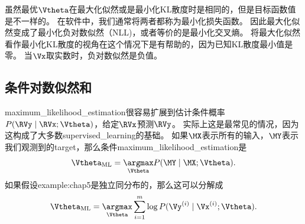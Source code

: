 虽然最优$\Vtheta$在最大化似然或是最小化KL散度时是相同的，但是目标函数值是不一样的。
在软件中，我们通常将两者都称为最小化损失函数。
因此最大化似然变成了最小化负对数似然（NLL)，或者等价的是最小化交叉熵。
将最大化似然看作最小化KL散度的视角在这个情况下是有帮助的，因为已知KL散度最小值是零。
当$\Vx$取实数时，负对数似然是负值。

\subsection{条件对数似然和}
\label{sec:conditional_log_likelihood_and_mean_squared_error}
\gls{maximum_likelihood_estimation}很容易扩展到估计条件概率$P(\RVy \mid \RVx;\Vtheta)$，给定$\RVx$预测$\RVy$。
实际上这是最常见的情况，因为这构成了大多数\gls{supervised_learning}的基础。
如果$\MX$表示所有的输入，$\MY$表示我们观测到的\gls{target}，那么条件\gls{maximum_likelihood_estimation}是
\begin{equation}
    \Vtheta_{\text{ML}} = \underset{\Vtheta}{\argmax} P(\MY \mid \MX; \Vtheta).
\end{equation}
如果假设\gls{example:chap5}是独立同分布的，那么这可以分解成
\begin{equation}
\label{eq:5.63}
    \Vtheta_{\text{ML}} = \underset{\Vtheta}{\argmax} \sum_{i=1}^m \log P(\Vy^{(i)} \mid \Vx^{(i)}; \Vtheta).
\end{equation}



